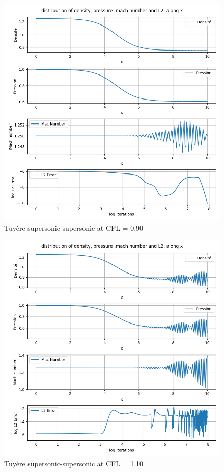 \documentclass[12pt]{article}
\begin{document}
\begin{figure}[H] %
    \centering
    \includegraphics[width=\textwidth,height=\textheight,keepaspectratio]{PLOTS/Tuyere_super_super_Macormack_CFL090.png}
    \caption{Tuyère supersonic-supersonic at CFL = 0.90}
    \label{fig:your_label}
\end{figure}

\begin{figure}[H] %
    \centering
    \includegraphics[width=\textwidth,height=\textheight,keepaspectratio]{PLOTS/Tuyere_super_super_Macormack_CFL110.png}
    \caption{Tuyère supersonic-supersonic at CFL = 1.10}
    \label{fig:your_label}
\end{figure}
\end{document}
